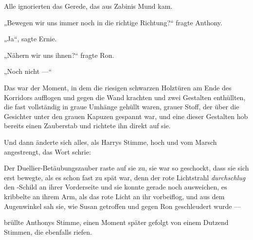 Alle ignorierten das Gerede, das aus Zabinis Mund kam.

„Bewegen wir uns immer noch in die richtige Richtung?“ fragte Anthony.

„Ja“, sagte Ernie.

„Nähern wir uns ihnen?“ fragte Ron.

„Noch nicht —“

Das war der Moment, in dem die riesigen schwarzen Holztüren am Ende des Korridors aufflogen und gegen die Wand krachten und zwei Gestalten enthüllten, die fast vollständig in graue Umhänge gehüllt waren, grauer Stoff, der über die Gesichter unter den grauen Kapuzen gespannt war, und eine dieser Gestalten hob bereits einen Zauberstab und richtete ihn direkt auf sie.

Und dann änderte sich alles, als Harrys Stimme, hoch und vom Marsch angestrengt, das Wort schrie:


Der Duellier-Betäubungszauber raste auf sie zu, sie war so geschockt, dass sie sich erst bewegte, als es schon fast zu spät war, denn der rote Lichtstrahl \emph{durchschlug} den -Schild an ihrer Vorderseite und sie konnte gerade noch ausweichen, es kribbelte an ihrem Arm, als das rote Licht an ihr vorbeiflog, und aus dem Augenwinkel sah sie, wie Susan getroffen und gegen Ron geschleudert wurde —

 brüllte Anthonys Stimme, einen Moment später gefolgt von einem Dutzend Stimmen, die ebenfalls  riefen.

